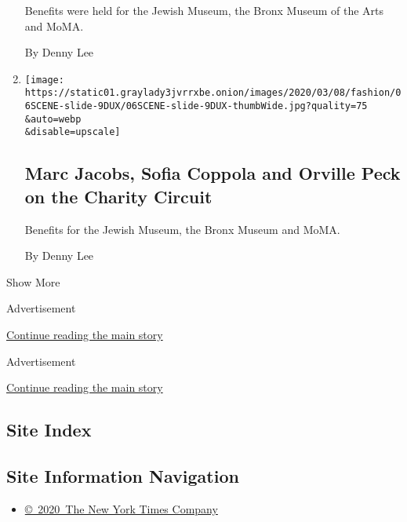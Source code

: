 \begin{enumerate}
  Benefits were held for the Jewish Museum, the Bronx Museum of the Arts
  and MoMA.

  By Denny Lee
\item
  \href{/slideshow/2020/03/06/fashion/marc-jacobs-sofia-coppola-and-orville-peck-on-the-charity-circuit.html}{}

  \texttt{[image: https://static01.graylady3jvrrxbe.onion/images/2020/03/08/fashion/06SCENE-slide-9DUX/06SCENE-slide-9DUX-thumbWide.jpg?quality=75\\\&auto=webp\\\&disable=upscale]}

  \hypertarget{marc-jacobs-sofia-coppola-and-orville-peck-on-the-charity-circuit}{%
  \subsection{Marc Jacobs, Sofia Coppola and Orville Peck on the Charity
  Circuit}\label{marc-jacobs-sofia-coppola-and-orville-peck-on-the-charity-circuit}}

  Benefits for the Jewish Museum, the Bronx Museum and MoMA.

  By Denny Lee
\end{enumerate}

Show More

Advertisement

\protect\hyperlink{after-mid1}{Continue reading the main story}

Advertisement

\protect\hyperlink{after-mktg}{Continue reading the main story}

\hypertarget{site-index}{%
\subsection{Site Index}\label{site-index}}

\hypertarget{site-information-navigation}{%
\subsection{Site Information
Navigation}\label{site-information-navigation}}

\begin{itemize}
\tightlist
\item
  \href{https://help.nytimes3xbfgragh.onion/hc/en-us/articles/115014792127-Copyright-notice}{©~2020~The
  New York Times Company}
\end{itemize}

